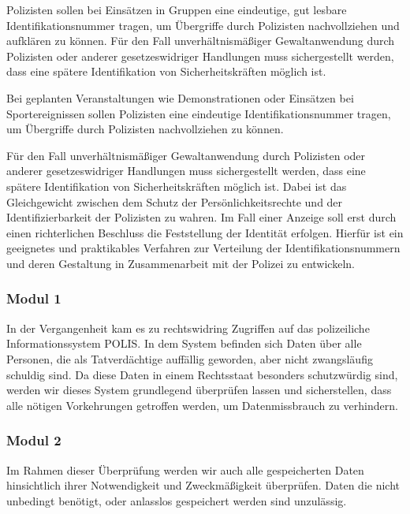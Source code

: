 \label{datenschutz:polizei}
\abstimmung
Polizisten sollen bei Einsätzen in Gruppen eine eindeutige, gut lesbare Identifikationsnummer tragen, um Übergriffe durch Polizisten nachvollziehen und aufklären zu können. Für den Fall unverhältnismäßiger Gewaltanwendung durch Polizisten oder anderer gesetzeswidriger Handlungen muss sichergestellt werden, dass eine spätere Identifikation von Sicherheitskräften möglich ist.
 
\abstimmung
Bei geplanten Veranstaltungen wie Demonstrationen oder Einsätzen bei Sportereignissen sollen Polizisten eine eindeutige Identifikationsnummer tragen, um Übergriffe durch Polizisten nachvollziehen zu können.

Für den Fall unverhältnismäßiger Gewaltanwendung durch Polizisten oder anderer gesetzeswidriger Handlungen muss sichergestellt werden, dass eine spätere Identifikation von Sicherheitskräften möglich ist. Dabei ist das Gleichgewicht zwischen dem Schutz der Persönlichkeitsrechte und der Identifizierbarkeit der Polizisten zu wahren. Im Fall einer Anzeige soll erst durch einen richterlichen Beschluss die Feststellung der Identität erfolgen. Hierfür ist ein geeignetes und praktikables Verfahren zur Verteilung der Identifikationsnummern und deren Gestaltung in Zusammenarbeit mit der Polizei zu entwickeln.
 
\subsubsection{Modul 1}
\abstimmung
In der Vergangenheit kam es zu rechtswidring Zugriffen auf das polizeiliche Informationssystem POLIS. In dem System befinden sich Daten über alle Personen, die als Tatverdächtige auffällig geworden, aber nicht zwangsläufig schuldig sind. Da diese Daten in einem Rechtsstaat besonders schutzwürdig sind, werden wir dieses System grundlegend überprüfen lassen und sicherstellen, dass alle nötigen Vorkehrungen getroffen werden, um Datenmissbrauch zu verhindern.

\subsubsection{Modul 2}
\abstimmung
Im Rahmen dieser Überprüfung werden wir auch alle gespeicherten Daten hinsichtlich ihrer Notwendigkeit und Zweckmäßigkeit überprüfen. Daten die nicht unbedingt benötigt, oder anlasslos gespeichert werden sind unzulässig.
 
